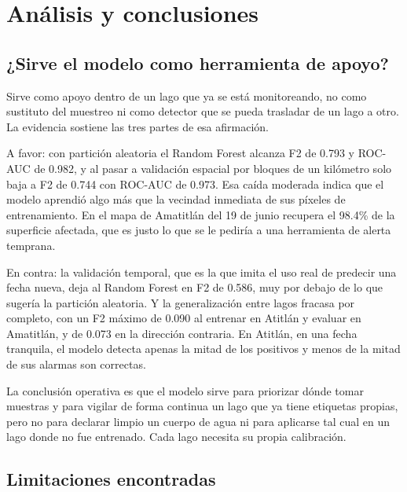 \documentclass[10pt,a4paper]{article}
\begin{document}
\section{Análisis y conclusiones}

\subsection{¿Sirve el modelo como herramienta de apoyo?}

Sirve como apoyo dentro de un lago que ya se está monitoreando, no como sustituto del muestreo ni como detector que
se pueda trasladar de un lago a otro. La evidencia sostiene las tres partes de esa afirmación.

A favor: con partición aleatoria el Random Forest alcanza F2 de 0.793 y ROC-AUC de 0.982, y al pasar a validación
espacial por bloques de un kilómetro solo baja a F2 de 0.744 con ROC-AUC de 0.973. Esa caída moderada indica que el
modelo aprendió algo más que la vecindad inmediata de sus píxeles de entrenamiento. En el mapa de Amatitlán del 19
de junio recupera el 98.4\% de la superficie afectada, que es justo lo que se le pediría a una herramienta de
alerta temprana.

En contra: la validación temporal, que es la que imita el uso real de predecir una fecha nueva, deja al Random
Forest en F2 de 0.586, muy por debajo de lo que sugería la partición aleatoria. Y la generalización entre lagos
fracasa por completo, con un F2 máximo de 0.090 al entrenar en Atitlán y evaluar en Amatitlán, y de 0.073 en la
dirección contraria. En Atitlán, en una fecha tranquila, el modelo detecta apenas la mitad de los positivos y menos
de la mitad de sus alarmas son correctas.

La conclusión operativa es que el modelo sirve para priorizar dónde tomar muestras y para vigilar de forma continua
un lago que ya tiene etiquetas propias, pero no para declarar limpio un cuerpo de agua ni para aplicarse tal cual en
un lago donde no fue entrenado. Cada lago necesita su propia calibración.

\subsection{Limitaciones encontradas}
\end{document}
